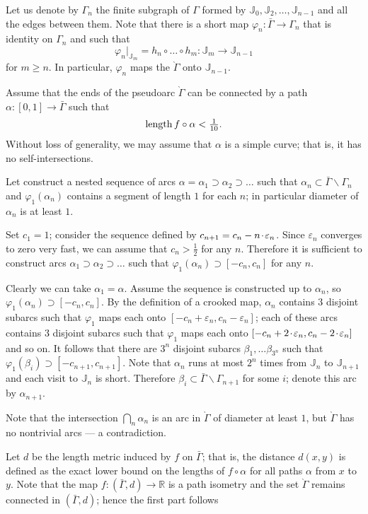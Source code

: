 \documentclass[oneside,a4paper]{article}
\def\JJ{\mathbb{J}}
\def\RR{\mathbb{R}}%
\def\eps{\varepsilon}
\def\phi{\varphi}
\def\ge{\geqslant}
\def\:{\colon}
\def\length{\mathop{\rm length}\nolimits}
\newcommand*{\z}[1]{#1\nobreak\discretionary{}%
            {\hbox{$\mathsurround=0pt #1$}}{}}
\let\oldcdot\cdot
\def\cdot{{\hskip0.5pt\z\oldcdot\hskip0.5pt}}
\begin{document}
Let us denote by $\Gamma_n$ the finite subgraph of $\Gamma$ formed by $\JJ_0,\JJ_2,\dots,\JJ_{n-1}$ and all the edges between them.
Note that there is a short map $\phi_n\:\bar\Gamma\to\Gamma_{n}$ that is identity on $\Gamma_{n}$ and such that
\[\phi_n|_{\JJ_m}=h_n\circ\dots\circ h_{m}\:\JJ_m\to\JJ_{n-1}\] 
for $m\ge n$.
In particular, $\phi_n$ maps the $\grave\Gamma$ onto $\JJ_{n-1}$.

Assume that the ends of the pseudoarc $\grave\Gamma$ can be connected by a path $\alpha\:[0,1]\to\bar\Gamma$ such that 
\[\length f\circ\alpha<\tfrac1{10}.\]
Without loss of generality, we may assume that $\alpha$ is a simple curve; that is, it has no self-intersections.

Let construct a nested sequence of arcs $\alpha=\alpha_1\supset \alpha_2\supset \dots$ such that $\alpha_n\subset \bar\Gamma\backslash\Gamma_n$ and $\phi_1(\alpha_n)$ contains a segment of length $1$ for each $n$;
in particular diameter of $\alpha_n$ is at least $1$.

Set $c_1=1$; consider the sequence defined by $c_{n+1}=c_n-n\cdot \eps_n$.
Since $\eps_n$ converges to zero very fast, we can assume that $c_n>\tfrac12$ for any $n$.
Therefore it is sufficient to construct arcs $\alpha_1\supset \alpha_2\supset \dots$ such that $\phi_1(\alpha_n)\supset [-c_n,c_n]$ for any $n$.

Clearly we can take $\alpha_1=\alpha$.
Assume the sequence is constructed up to $\alpha_n$, so $\phi_1(\alpha_n)\supset [-c_n,c_n]$.
By the definition of a crooked map,
$\alpha_n$ contains $3$ disjoint subarcs such that $\phi_1$ maps each onto $[-c_n+\eps_n,c_n-\eps_n]$;
each of these arcs contains $3$ disjoint subarcs such that $\phi_1$ maps each  onto $[-c_n+2\cdot\eps_n,c_n-2\cdot \eps_n]$ and so on.
It follows that there are $3^n$ disjoint subarcs $\beta_1,\dots \beta_{3^n}$ such that $\phi_1(\beta_i)\supset [-c_{n+1},c_{n+1}]$.
Note that $\alpha_n$ runs at most $2^n$ times  from $\JJ_n$ to $\JJ_{n+1}$
and each visit to $\JJ_n$ is short.
Therefore $\beta_i\subset \bar\Gamma\backslash\Gamma_{n+1}$ for some $i$; denote this arc by $\alpha_{n+1}$.

Note that the intersection $\bigcap_n\alpha_n$ is an arc in $\grave\Gamma$ of diameter at least $1$, but $\grave\Gamma$ has no nontrivial arcs --- a contradiction.

Let $d$ be the length metric induced by $f$ on $\bar\Gamma$;
that is, the distance $d(x,y)$ is defined as the exact lower bound on the lengths of $f\circ\alpha$ for all paths $\alpha$ from $x$ to $y$.
Note that the map $f\:(\bar\Gamma,d)\to\RR$ is a path isometry and the set $\grave\Gamma$ remains connected in $(\bar\Gamma,d)$; hence the first part follows
\end{document}

